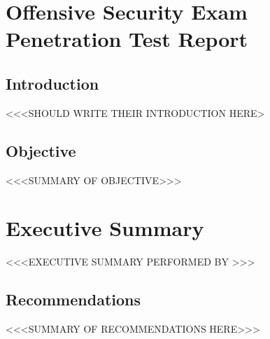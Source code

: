 \section{Offensive Security Exam Penetration Test Report}
\subsection{Introduction}
\osid <<<SHOULD WRITE THEIR INTRODUCTION HERE>

\subsection{Objective}
<<<SUMMARY OF OBJECTIVE>>>

\newpage
\section{Executive Summary}
<<<EXECUTIVE SUMMARY PERFORMED BY \osid>>>

\subsection{Recommendations}
<<<SUMMARY OF RECOMMENDATIONS HERE>>>